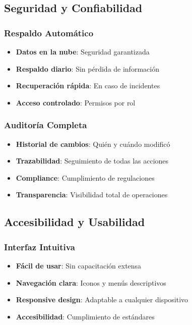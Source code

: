 \documentclass[12pt,a4paper]{article}
\begin{document}
\subsection{Seguridad y Confiabilidad}

\subsubsection{Respaldo Automático}
\begin{itemize}
    \item \textbf{Datos en la nube}: Seguridad garantizada
    \item \textbf{Respaldo diario}: Sin pérdida de información
    \item \textbf{Recuperación rápida}: En caso de incidentes
    \item \textbf{Acceso controlado}: Permisos por rol
\end{itemize}

\subsubsection{Auditoría Completa}
\begin{itemize}
    \item \textbf{Historial de cambios}: Quién y cuándo modificó
    \item \textbf{Trazabilidad}: Seguimiento de todas las acciones
    \item \textbf{Compliance}: Cumplimiento de regulaciones
    \item \textbf{Transparencia}: Visibilidad total de operaciones
\end{itemize}

\subsection{Accesibilidad y Usabilidad}

\subsubsection{Interfaz Intuitiva}
\begin{itemize}
    \item \textbf{Fácil de usar}: Sin capacitación extensa
    \item \textbf{Navegación clara}: Iconos y menús descriptivos
    \item \textbf{Responsive design}: Adaptable a cualquier dispositivo
    \item \textbf{Accesibilidad}: Cumplimiento de estándares
\end{itemize}
\end{document}

